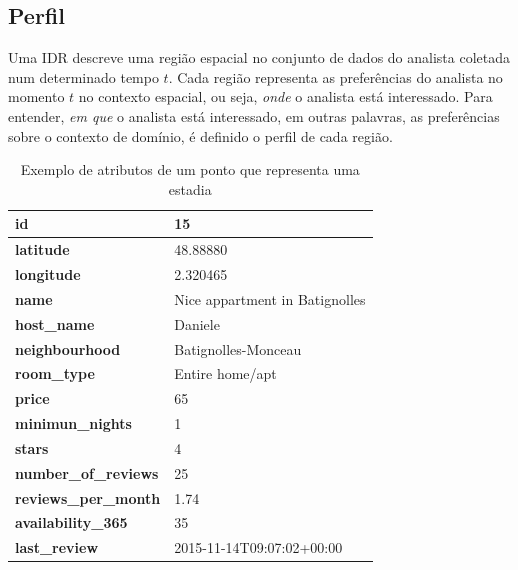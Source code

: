 
\subsection{Perfil}

Uma IDR descreve uma região espacial no conjunto de dados do analista coletada num determinado tempo $t$. Cada região representa as preferências do analista no momento $t$ no contexto espacial, ou seja, {\em onde} o analista está interessado. Para entender, {\em em que} o analista está interessado, em outras palavras, as preferências sobre o contexto de domínio, é definido o perfil de cada região.

\begin{table}[]
	\centering
	\begin{tabular}{|l|l|}
		\hline
		\textbf{id}                  & 15                             \\ \hline
		\textbf{latitude}            & 48.88880                       \\ \hline
		\textbf{longitude}           & 2.320465                       \\ \hline
		\textbf{name}                & Nice appartment in Batignolles \\ \hline
		\textbf{host\_name}          & Daniele                        \\ \hline
		\textbf{neighbourhood}       & Batignolles-Monceau            \\ \hline
		\textbf{room\_type}          & Entire home/apt                \\ \hline
		\textbf{price}               & 65                             \\ \hline
		\textbf{minimun\_nights}     & 1                              \\ \hline
		\textbf{stars}               & 4                              \\ \hline
		\textbf{number\_of\_reviews} & 25                             \\ \hline
		\textbf{reviews\_per\_month} & 1.74                           \\ \hline
		\textbf{availability\_365}   & 35                             \\ \hline
		\textbf{last\_review}        & 2015-11-14T09:07:02+00:00      \\ \hline
	\end{tabular}
	\caption{Exemplo de atributos de um ponto que representa uma estadia}
	\label{table:atributos}
\end{table}

